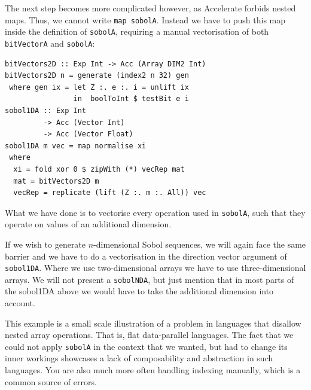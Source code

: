 \documentclass[preprint]{sigplanconf}
\begin{document}
The next step becomes more complicated however, as Accelerate forbids
nested maps. Thus, we cannot write \verb|map sobolA|.  Instead we have
to push this map inside the definition of \verb|sobolA|, requiring a
manual vectorisation of both \verb|bitVectorA| and \verb|sobolA|:
\begin{verbatim}
bitVectors2D :: Exp Int -> Acc (Array DIM2 Int)
bitVectors2D n = generate (index2 n 32) gen
 where gen ix = let Z :. e :. i = unlift ix
                in  boolToInt $ testBit e i
sobol1DA :: Exp Int
         -> Acc (Vector Int)
         -> Acc (Vector Float)
sobol1DA m vec = map normalise xi
 where
  xi = fold xor 0 $ zipWith (*) vecRep mat
  mat = bitVectors2D m
  vecRep = replicate (lift (Z :. m :. All)) vec
\end{verbatim}
What we have done is to vectorise every operation used in
\verb|sobolA|, such that they operate on values of an additional
dimension.

If we wish to generate $n$-dimensional Sobol sequences, we will again
face the same barrier and we have to do a vectorisation in the
direction vector argument of \verb|sobol1DA|. Where we use
two-dimensional arrays we have to use three-dimensional arrays. We
will not present a \verb|sobolNDA|, but just mention that in most
parts of the sobol1DA above we would have to take the additional
dimension into account.


This example is a small scale illustration of a problem in languages
that disallow nested array operations. That is, flat data-parallel
languages. The fact that we could not apply \verb|sobolA| in the
context that we wanted, but had to change its inner workings showcases
a lack of composability and abstraction in such languages. You are
also much more often handling indexing manually, which is a common
source of errors.
\end{document}
